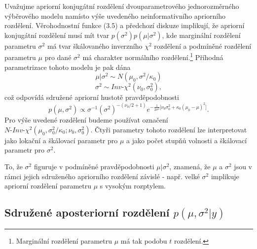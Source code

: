 Uvažujme apriorní konjugátní rozdělení dvouparametrového jednorozměrného výběrového modelu namísto výše uvedeného neinformativního apriorního rozdělení. Věrohodnostní funkce (3.5) a předchozí diskuze implikují, že apriorní konjugátní rozdělení musí mít tvar $p(\sigma^2)p(\mu | \sigma^2)$, kde marginální rozdělení parametru $\sigma^2$ má tvar škálovaného inverzního $\chi^2$ rozdělení a podmíněné rozdělení parametru $\mu$ pro dané $\sigma^2$ má charakter normálního rozdělení.\footnote{Marginální rozdělení parametru $\mu$ má tak podobu $t$ rozdělení.} Příhodná parametrizace tohoto modelu je pak dána
\begin{equation}
\mu | \sigma^2 \sim N(\mu_0, \sigma^2 / \kappa_0)
\end{equation}
\begin{equation}
\sigma^2 \sim \textit{Inv-}\chi^2 (\nu_0, \sigma_0^2),
\end{equation}
což odpovídá sdružené apriorní hustotě pravděpodobnosti
\begin{equation}
p(\mu, \sigma^2) \varpropto \sigma ^ {-1} (\sigma ^ 2)^{-(\nu_0 / 2 + 1)}e^{-\frac{1}{2 \sigma ^ 2}\big[\nu_0 \sigma_0 ^ 2 + \kappa_0 (\mu_0 - \mu)^2 \big]}.
\end{equation}
Pro výše uvedené rozdělení budeme používat označení $\textit{N-Inv-}\chi ^ 2(\mu_0, \sigma_0 ^ 2 / \kappa_0; \nu_0, \sigma_0 ^ 2)$. Čtyři parametry tohoto rozdělení lze interpretovat jako lokační a škálovací parametr pro $\mu$ a jako počet stupňů volnosti a škálovací parametr pro $\sigma ^ 2$.

To, že $\sigma ^ 2$ figuruje v podmíněné pravděpodobnosti $\mu | \sigma^2$, znamená, že $\mu$ a $\sigma^2$ jsou v rámci jejich sdruženého apriorního rozdělení závislé - např. velké $\sigma^2$ implikuje apriorní rozdělení parametru $\mu$ s vysokým rozptylem.

\subsection{Sdružené aposteriorní rozdělení $p(\mu, \sigma^2 | y)$}

